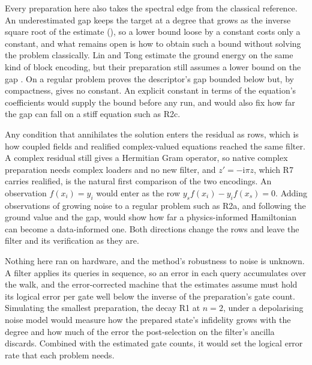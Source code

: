 Every preparation here also takes the spectral edge from the classical reference. An underestimated gap keeps the target at a degree that grows as the inverse square root of the estimate (), so a lower bound loose by a constant costs only a constant, and what remains open is how to obtain such a bound without solving the problem classically. Lin and Tong estimate the ground energy on the same kind of block encoding, but their preparation still assumes a lower bound on the gap \cite{lintong2020groundstate}. On a regular problem  proves the descriptor's gap bounded below but, by compactness, gives no constant. An explicit constant in terms of the equation's coefficients would supply the bound before any run, and would also fix how far the gap can fall on a stiff equation such as R2c.

Any condition that annihilates the solution enters the residual as rows, which is how coupled fields and realified complex-valued equations reached the same filter. A complex residual still gives a Hermitian Gram operator, so native complex preparation needs complex loaders and no new filter, and $z'=-\mathrm{i}\pi z$, which R7 carries realified, is the natural first comparison of the two encodings. An observation $f(x_i)=y_i$ would enter as the row $y_sf(x_i)-y_if(x_s)=0$. Adding observations of growing noise to a regular problem such as R2a, and following the ground value and the gap, would show how far a physics-informed Hamiltonian can become a data-informed one. Both directions change the rows and leave the filter and its verification as they are.

Nothing here ran on hardware, and the method's robustness to noise is unknown. A filter applies its queries in sequence, so an error in each query accumulates over the walk, and the error-corrected machine that the estimates assume must hold its logical error per gate well below the inverse of the preparation's gate count. Simulating the smallest preparation, the decay R1 at $n=2$, under a depolarising noise model would measure how the prepared state's infidelity grows with the degree and how much of the error the post-selection on the filter's ancilla discards. Combined with the estimated gate counts, it would set the logical error rate that each problem needs.
